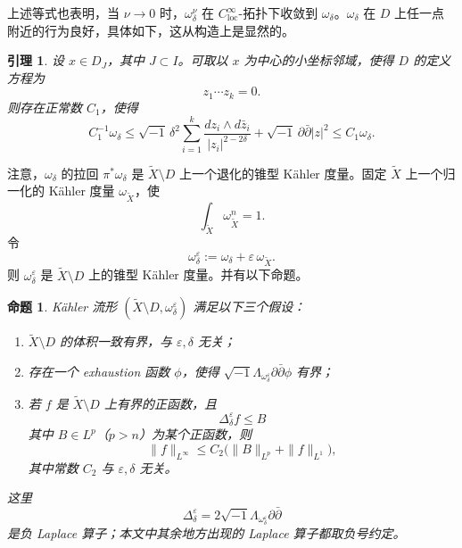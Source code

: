 \documentclass[12pt,a4paper]{article}
\newtheorem{lemma}[theorem]{引理}
\newtheorem{proposition}[theorem]{命题}
\begin{document}
上述等式也表明，当 \(\nu\to 0\) 时，\(\omega^\nu_\delta\) 在 \(C^\infty_{\mathrm{loc}}\)-拓扑下收敛到 \(\omega_\delta\)。\(\omega_\delta\) 在 \(D\) 上任一点附近的行为良好，具体如下，这从构造上是显然的。

\begin{lemma}
设 \(x\in D_J\)，其中 \(J\subset I\)。可取以 \(x\) 为中心的小坐标邻域，使得 \(D\) 的定义方程为
\[
z_1\cdots z_k=0.
\]
则存在正常数 \(C_1\)，使得
\[
C_1^{-1}\omega_\delta
\le
\sqrt{-1}\,\delta^2\sum_{i=1}^k \frac{dz_i\wedge d\bar z_i}{|z_i|^{2-2\delta}}
+\sqrt{-1}\,\partial\bar\partial |z|^2
\le
C_1\omega_\delta.
\]
\end{lemma}

注意，\(\omega_\delta\) 的拉回 \(\pi^*\omega_\delta\) 是 \(\widetilde X\setminus D\) 上一个退化的锥型 Kähler 度量。固定 \(\widetilde X\) 上一个归一化的 Kähler 度量 \(\omega_{\widetilde X}\)，使
\[
\int_{\widetilde X}\omega_{\widetilde X}^n=1.
\]
令
\[
\omega^\varepsilon_\delta:=\omega_\delta+\varepsilon\,\omega_{\widetilde X}.
\]
则 \(\omega^\varepsilon_\delta\) 是 \(\widetilde X\setminus D\) 上的锥型 Kähler 度量。并有以下命题。

\begin{proposition}
Kähler 流形 \((\widetilde X\setminus D,\omega^\varepsilon_\delta)\) 满足以下三个假设：
\begin{enumerate}[label=\arabic*.]
\item \(\widetilde X\setminus D\) 的体积一致有界，与 \(\varepsilon,\delta\) 无关；
\item 存在一个 exhaustion 函数 \(\phi\)，使得 \(\sqrt{-1}\Lambda_{\omega^\varepsilon_\delta}\partial\bar\partial \phi\) 有界；
\item 若 \(f\) 是 \(\widetilde X\setminus D\) 上有界的正函数，且
\[
\Delta_{\delta}^{\varepsilon}f\le B
\]
其中 \(B\in L^p\)（\(p>n\)）为某个正函数，则
\[
\|f\|_{L^\infty}\le C_2\bigl(\|B\|_{L^p}+\|f\|_{L^1}\bigr),
\]
其中常数 \(C_2\) 与 \(\varepsilon,\delta\) 无关。
\end{enumerate}
这里
\[
\Delta_{\delta}^{\varepsilon}=2\sqrt{-1}\Lambda_{\omega^\varepsilon_\delta}\partial\bar\partial
\]
是负 Laplace 算子；本文中其余地方出现的 Laplace 算子都取负号约定。
\end{proposition}
\end{document}
